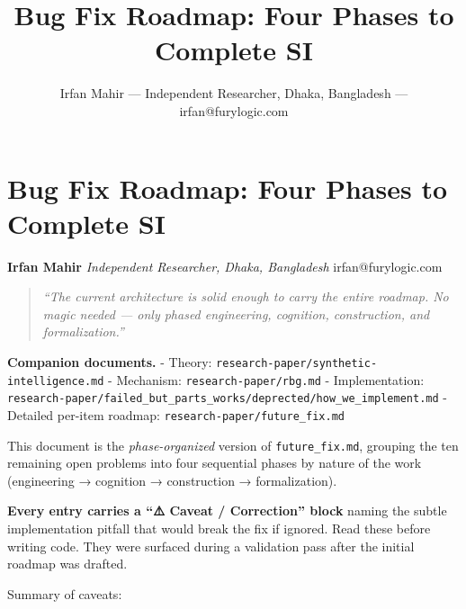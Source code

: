 \documentclass[
  11pt,
  a4paper,
]{article}
\title{Bug Fix Roadmap: Four Phases to Complete SI}
\author{Irfan Mahir --- Independent Researcher, Dhaka, Bangladesh ---
irfan@furylogic.com}
\date{}
\begin{document}
\maketitle

{
\hypersetup{linkcolor=}
\setcounter{tocdepth}{3}
\tableofcontents
}
\section{Bug Fix Roadmap: Four Phases to Complete
SI}\label{bug-fix-roadmap-four-phases-to-complete-si}

\textbf{Irfan Mahir} \emph{Independent Researcher, Dhaka, Bangladesh}
irfan@furylogic.com

\begin{quote}
\emph{``The current architecture is solid enough to carry the entire
roadmap. No magic needed --- only phased engineering, cognition,
construction, and formalization.''}
\end{quote}

\textbf{Companion documents.} - Theory:
\texttt{research-paper/synthetic-intelligence.md} - Mechanism:
\texttt{research-paper/rbg.md} - Implementation:
\texttt{research-paper/failed\_but\_parts\_works/deprected/how\_we\_implement.md}
- Detailed per-item roadmap: \texttt{research-paper/future\_fix.md}

This document is the \emph{phase-organized} version of
\texttt{future\_fix.md}, grouping the ten remaining open problems into
four sequential phases by nature of the work (engineering → cognition →
construction → formalization).

\textbf{Every entry carries a ``⚠️ Caveat / Correction'' block} naming
the subtle implementation pitfall that would break the fix if ignored.
Read these before writing code. They were surfaced during a validation
pass after the initial roadmap was drafted.

Summary of caveats:
\end{document}
